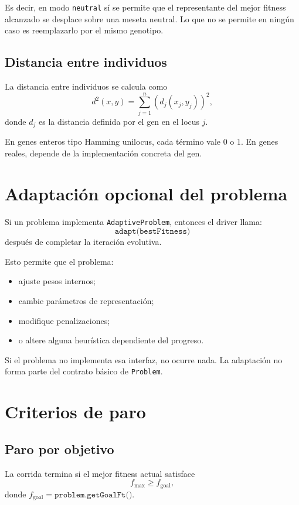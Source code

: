 \documentclass[11pt]{article}
\begin{document}
Es decir, en modo \texttt{neutral} s\'i se permite que el representante del
mejor fitness alcanzado se desplace sobre una meseta neutral. Lo que no se
permite en ning\'un caso es reemplazarlo por el mismo genotipo.

\subsection{Distancia entre individuos}

La distancia entre individuos se calcula como
\[
d^2(x,y) = \sum_{j=1}^{n} \left( d_j(x_j,y_j) \right)^2,
\]
donde \(d_j\) es la distancia definida por el gen en el locus \(j\).

En genes enteros tipo Hamming unilocus, cada t\'ermino vale \(0\) o \(1\). En
genes reales, depende de la implementaci\'on concreta del gen.

\section{Adaptaci\'on opcional del problema}

Si un problema implementa \texttt{AdaptiveProblem}, entonces el driver llama:
\[
\texttt{adapt(bestFitness)}
\]
despu\'es de completar la iteraci\'on evolutiva.

Esto permite que el problema:

\begin{itemize}
  \item ajuste pesos internos;
  \item cambie par\'ametros de representaci\'on;
  \item modifique penalizaciones;
  \item o altere alguna heur\'istica dependiente del progreso.
\end{itemize}

Si el problema no implementa esa interfaz, no ocurre nada. La adaptaci\'on no
forma parte del contrato b\'asico de \texttt{Problem}.

\section{Criterios de paro}

\subsection{Paro por objetivo}

La corrida termina si el mejor fitness actual satisface
\[
f_{\max} \geq f_{\text{goal}},
\]
donde \(f_{\text{goal}} = \texttt{problem.getGoalFt()}\).
\end{document}
